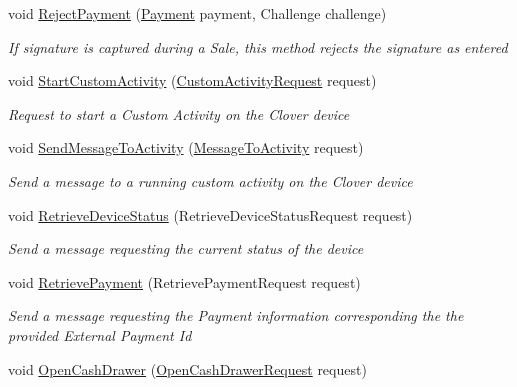 \begin{DoxyCompactItemize}
void \hyperlink{classcom_1_1clover_1_1remotepay_1_1sdk_1_1_clover_connector_a2ffc66f46fddbf37d780ca269dd3b562}{Reject\+Payment} (\hyperlink{classcom_1_1clover_1_1sdk_1_1v3_1_1payments_1_1_payment}{Payment} payment, Challenge challenge)
\begin{DoxyCompactList}\small\item\em If signature is captured during a Sale, this method rejects the signature as entered \end{DoxyCompactList}\item 
void \hyperlink{classcom_1_1clover_1_1remotepay_1_1sdk_1_1_clover_connector_a7c4a08c49e7285e95d7e36340ebe3306}{Start\+Custom\+Activity} (\hyperlink{classcom_1_1clover_1_1remotepay_1_1sdk_1_1_custom_activity_request}{Custom\+Activity\+Request} request)
\begin{DoxyCompactList}\small\item\em Request to start a Custom Activity on the Clover device \end{DoxyCompactList}\item 
void \hyperlink{classcom_1_1clover_1_1remotepay_1_1sdk_1_1_clover_connector_a328a0dd8b4ed02567f7e8d3184f35038}{Send\+Message\+To\+Activity} (\hyperlink{classcom_1_1clover_1_1remotepay_1_1sdk_1_1_message_to_activity}{Message\+To\+Activity} request)
\begin{DoxyCompactList}\small\item\em Send a message to a running custom activity on the Clover device \end{DoxyCompactList}\item 
void \hyperlink{classcom_1_1clover_1_1remotepay_1_1sdk_1_1_clover_connector_a7a5404c24cac6be283c80a7983bfa4eb}{Retrieve\+Device\+Status} (Retrieve\+Device\+Status\+Request request)
\begin{DoxyCompactList}\small\item\em Send a message requesting the current status of the device \end{DoxyCompactList}\item 
void \hyperlink{classcom_1_1clover_1_1remotepay_1_1sdk_1_1_clover_connector_a786435c5849a2d8befd83173f70e05a7}{Retrieve\+Payment} (Retrieve\+Payment\+Request request)
\begin{DoxyCompactList}\small\item\em Send a message requesting the Payment information corresponding the the provided External Payment Id \end{DoxyCompactList}\item 
void \hyperlink{classcom_1_1clover_1_1remotepay_1_1sdk_1_1_clover_connector_afe1e4de054f3bd0949e3d75730fc168f}{Open\+Cash\+Drawer} (\hyperlink{classcom_1_1clover_1_1remotepay_1_1sdk_1_1_open_cash_drawer_request}{Open\+Cash\+Drawer\+Request} request)

\end{DoxyCompactItemize}
